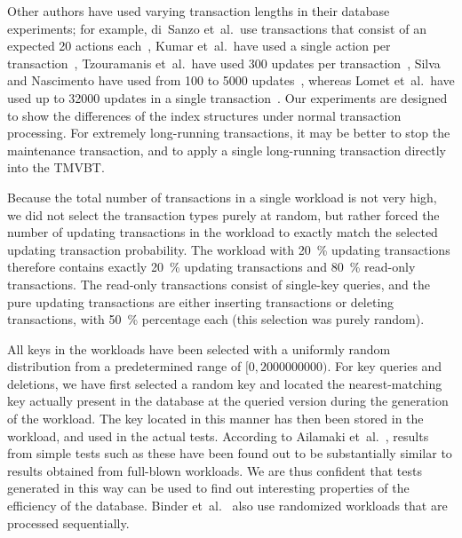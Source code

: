 Other authors have used varying transaction lengths in their database
experiments; for example, di~Sanzo et~al.\ use transactions that consist
of an expected \num{20} actions each~\cite{sanzo:2008:performance}, Kumar
et~al.\ have used a single action per transaction~\cite{kumar:1998:bitemporal},
Tzouramanis et~al.\ have used \num{300} updates per
transaction~\cite{tzouramanis:1999:overlapping}, Silva and Nascimento have used
from \num{100} to \num{5000} updates~\cite{silva:2000:bitemporal}, whereas
Lomet et~al.\ have used up to \num{32000} updates in a single
transaction~\cite{lomet:2006:transactiontime}.
Our experiments are designed to show the differences of the index structures
under normal transaction processing. 
For extremely long-running transactions, it may be better to stop the
maintenance transaction, and to apply a single long-running transaction
directly into the TMVBT.

Because the total number of transactions in a single workload is not
very high, we did not select the transaction types purely at random,
but rather forced the number of updating transactions in the workload
to exactly match the selected updating transaction probability.
The workload with \SI{20}{\percent} updating transactions therefore contains
exactly \SI{20}{\percent} updating transactions and \SI{80}{\percent}
read-only transactions. 
The read-only transactions consist of single-key queries, and the
pure updating transactions are either inserting transactions or
deleting transactions, with \SI{50}{\percent} percentage each (this
selection was purely random). 

All keys in the workloads have been selected with a uniformly random
distribution from a predetermined range of $[\num{0},\num{2000000000})$. 
For key queries and deletions, we have first selected a random key and
located the nearest-matching key actually present in the database at
the queried version during the generation of the workload.
The key located in this manner has then been stored in the workload, and used
in the actual tests.
According to Ailamaki et~al.~\cite{ailamaki:1999:dbms}, results from
simple tests such as these have been found out to be substantially
similar to results obtained from full-blown  workloads.
We are thus confident that tests generated in this way can be used to
find out interesting properties of the efficiency of the database. 
Binder et~al.~\cite{binder:2007:multiversion,binder:2007:evaluation}
also use randomized workloads that are processed sequentially.

